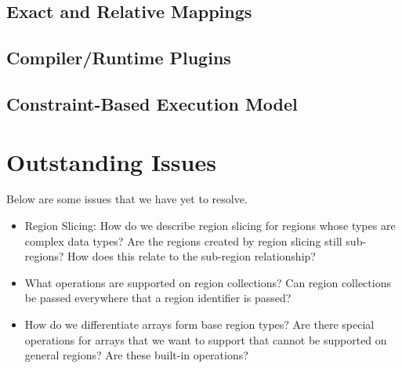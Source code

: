 \documentclass{article}
\theoremstyle{definition}
\begin{document}
\subsection{Exact and Relative Mappings \label{ConstraintMap}}

\subsection{Compiler/Runtime Plugins \label{Plugins}}

\subsection{Constraint-Based Execution Model \label{Execution}}

\pagebreak


\section{Outstanding Issues \label{OutstandingQs}} 
\noindent
Below are some issues that we have yet to resolve.
\begin{itemize}
\item Region Slicing: How do we describe region slicing for regions whose 
types are complex data types?  Are the regions created by region slicing 
still sub-regions?  How does this relate to the sub-region relationship?
\item What operations are supported on region collections?  Can region collections
be passed everywhere that a region identifier is passed?
\item How do we differentiate arrays form base region types?  Are there special
operations for arrays that we want to support that cannot be supported on
general regions?  Are these built-in operations?
\end{itemize}

\pagebreak



\end{document}
